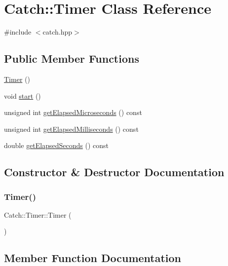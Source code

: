\hypertarget{class_catch_1_1_timer}{}\section{Catch\+:\+:Timer Class Reference}
\label{class_catch_1_1_timer}


{\ttfamily \#include $<$catch.\+hpp$>$}

\subsection*{Public Member Functions}
\begin{DoxyCompactItemize}
\item 
\hyperlink{class_catch_1_1_timer_af09b7cd7a40af71f4704262afb31558a}{Timer} ()
\item 
void \hyperlink{class_catch_1_1_timer_a0a56e879e43f36c102bf9ea8b5fc8b72}{start} ()
\item 
unsigned int \hyperlink{class_catch_1_1_timer_af592ca4a9d340b9855732e4af777eaf0}{get\+Elapsed\+Microseconds} () const
\item 
unsigned int \hyperlink{class_catch_1_1_timer_a2081b2d36950ab6912e7c4958afe0099}{get\+Elapsed\+Milliseconds} () const
\item 
double \hyperlink{class_catch_1_1_timer_ae1615c8a9aa44b7a96cfe8a35d34e5de}{get\+Elapsed\+Seconds} () const
\end{DoxyCompactItemize}


\subsection{Constructor \& Destructor Documentation}
\hypertarget{class_catch_1_1_timer_af09b7cd7a40af71f4704262afb31558a}{}\label{class_catch_1_1_timer_af09b7cd7a40af71f4704262afb31558a} 
\subsubsection{\texorpdfstring{Timer()}{Timer()}}
{\footnotesize\ttfamily Catch\+::\+Timer\+::\+Timer (\begin{DoxyParamCaption}{ }\end{DoxyParamCaption})\hspace{0.3cm}{\ttfamily [inline]}}



\subsection{Member Function Documentation}
\hypertarget{class_catch_1_1_timer_af592ca4a9d340b9855732e4af777eaf0}{}\label{class_catch_1_1_timer_af592ca4a9d340b9855732e4af777eaf0} 
